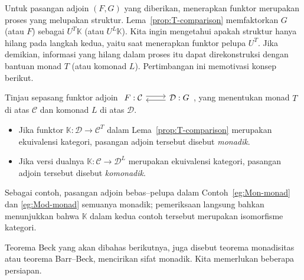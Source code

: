 Untuk pasangan adjoin $(F,G)$ yang diberikan, menerapkan funktor merupakan
proses yang melupakan struktur. Lema~\ref{prop:T-comparison} memfaktorkan $G$
(atau $F$) sebagai $U^T\mathbb{K}$ (atau $U^L\mathbb{K}$). Kita ingin
mengetahui apakah struktur hanya hilang pada langkah kedua, yaitu saat
menerapkan funktor pelupa $U^T$. Jika demikian, informasi yang hilang dalam
proses itu dapat direkonstruksi dengan bantuan monad $T$ (atau komonad $L$).
Pertimbangan ini memotivasi konsep berikut.

\begin{definition}\label{def:monadic}
	Tinjau sepasang funktor adjoin
	$\begin{tikzcd}
		F: \mathcal{C} \arrow[shift left, r] & \mathcal{D}: G \arrow[shift left, l]
	\end{tikzcd}$,
	yang menentukan monad $T$ di atas $\mathcal{C}$ dan komonad $L$ di atas
	$\mathcal{D}$.
	\begin{itemize}
		\item Jika funktor $\mathbb{K}:\mathcal{D}\to\mathcal{C}^T$ dalam
		Lema~\ref{prop:T-comparison} merupakan ekuivalensi kategori, pasangan
		adjoin tersebut disebut \emph{monadik}.
		\item Jika versi dualnya
		$\mathbb{K}:\mathcal{C}\to\mathcal{D}^L$ merupakan ekuivalensi kategori,
		pasangan adjoin tersebut disebut \emph{komonadik}.
	\end{itemize}
\end{definition}

Sebagai contoh, pasangan adjoin bebas--pelupa dalam
Contoh~\ref{eg:Mon-monad} dan \ref{eg:Mod-monad} semuanya monadik; pemeriksaan
langsung bahkan menunjukkan bahwa $\mathbb{K}$ dalam kedua contoh tersebut
merupakan isomorfisme kategori.

Teorema Beck yang akan dibahas berikutnya, juga disebut teorema monadisitas atau
teorema Barr--Beck, mencirikan sifat monadik. Kita memerlukan beberapa
persiapan.

